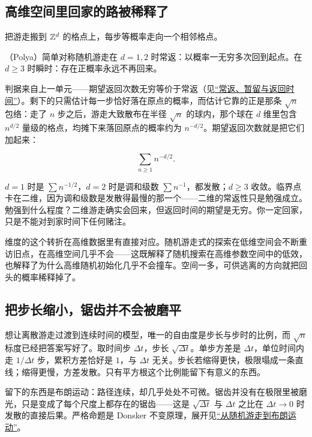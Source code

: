 \subsection{高维空间里回家的路被稀释了}

把游走搬到 \(\mathbb{Z}^d\) 的格点上，每步等概率走向一个相邻格点。

\begin{theorem}
（Polya）简单对称随机游走在 \(d=1,2\) 时常返：以概率一无穷多次回到起点。在 \(d\ge3\) 时瞬时：存在正概率永远不再回来。
\end{theorem}

判据来自上一单元——期望返回次数无穷等价于常返（见\hyperref[sec:06-Random-Processes/03-Markov-Chains/03]{``常返、暂留与返回时间''}）。剩下的只需估计每一步恰好落在原点的概率，而估计它靠的正是那条 \(\sqrt n\) 包络：走了 \(n\) 步之后，游走大致散布在半径 \(\sqrt n\) 的球内，那个球在 \(d\) 维里包含 \(n^{d/2}\) 量级的格点，均摊下来落回原点的概率约为 \(n^{-d/2}\)。期望返回次数就是把它们加起来：

\[
\sum_{n\ge1}n^{-d/2}.
\]

\(d=1\) 时是 \(\sum n^{-1/2}\)，\(d=2\) 时是调和级数 \(\sum n^{-1}\)，都发散；\(d\ge3\) 收敛。临界点卡在二维，因为调和级数是发散得最慢的那一个——二维的常返性只是勉强成立。勉强到什么程度？二维游走确实会回来，但返回时间的期望是无穷。你一定回家，只是不能对到家时间下任何赌注。

维度的这个转折在高维数据里有直接对应。随机游走式的探索在低维空间会不断重访旧点，在高维空间几乎不会——这既解释了随机搜索在高维参数空间中的低效，也解释了为什么高维随机初始化几乎不会撞车。空间一多，可供逃离的方向就把回头的概率稀释掉了。

\subsection{把步长缩小，锯齿并不会被磨平}

想让离散游走过渡到连续时间的模型，唯一的自由度是步长与步时的比例，而 \(\sqrt n\) 标度已经把答案写好了。取时间步 \(\Delta t\)，步长 \(\sqrt{\Delta t}\)。单步方差是 \(\Delta t\)，单位时间内走 \(1/\Delta t\) 步，累积方差恰好是 \(1\)，与 \(\Delta t\) 无关。步长若缩得更快，极限塌成一条直线；缩得更慢，方差发散。只有平方根这个比例能留下有意义的东西。

留下的东西是布朗运动：路径连续，却几乎处处不可微。锯齿并没有在极限里被磨光，只是变成了每个尺度上都存在的锯齿——这是 \(\sqrt{\Delta t}\) 与 \(\Delta t\) 之比在 \(\Delta t\to0\) 时发散的直接后果。严格命题是 Donsker 不变原理，展开见\hyperref[sec:06-Random-Processes/06-Diffusion-and-SDE/01]{``从随机游走到布朗运动''}。

